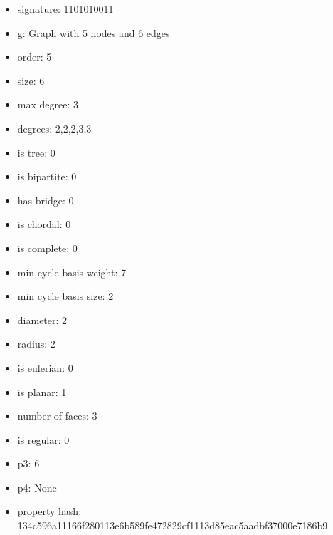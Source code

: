 \begin{itemize}
\item signature: 1101010011
\item g: Graph with 5 nodes and 6 edges
\item order: 5
\item size: 6
\item max degree: 3
\item degrees: 2,2,2,3,3
\item is tree: 0
\item is bipartite: 0
\item has bridge: 0
\item is chordal: 0
\item is complete: 0
\item min cycle basis weight: 7
\item min cycle basis size: 2
\item diameter: 2
\item radius: 2
\item is eulerian: 0
\item is planar: 1
\item number of faces: 3
\item is regular: 0
\item p3: 6
\item p4: None
\item property hash: 134c596a11166f280113e6b589fe472829cf1113d85eac5aadbf37000e7186b9
\end{itemize}
\newpage
\begin{figure}
\end{figure}
